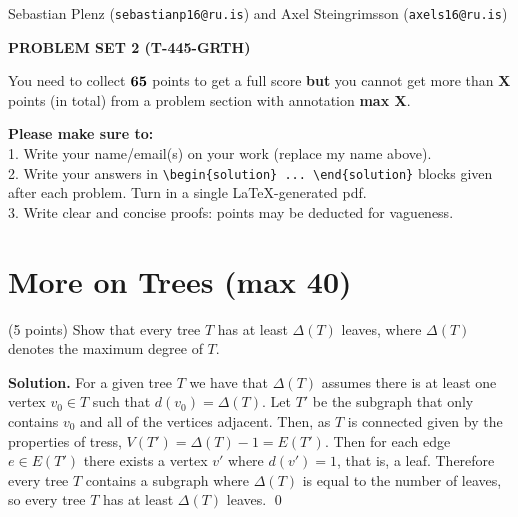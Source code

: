 \documentclass[a4paper,11pt]{amsart}
\newcounter{temp}
\newcounter{prob_counter}
\newenvironment{problem}
{\begin{list}{{\bf \arabic{prob_counter}}}{
      \usecounter{prob_counter}
      \addtolength{\labelsep}{.6ex}
      \addtolength{\itemsep}{4.3ex}
      \setlength{\leftmargin}{1.4em}}
      \setcounter{prob_counter}{\value{temp}}
}
{\setcounter{temp}{\value{prob_counter}}  
  \end{list}
}
\newenvironment{solution}{\textbf{Solution.}}{\qed}
\newcommand{\rubrik}[1]{\bigskip \begin{center}{\bf #1}\end{center} \medskip}
\begin{document}
\pagestyle{empty}
\thispagestyle{empty}

{\small{\sc\noindent
        Sebastian Plenz ({\tt sebastianp16@ru.is})  and Axel Steingrimsson ({\tt axels16@ru.is})
}}

\rubrik{PROBLEM SET 2 (T-445-GRTH)}

You need to collect $\bf 65$ points to get a full score {\bf but} you cannot get more than {\bf X} points (in total) from a problem section with annotation {\bf max X}.

{\bf Please make sure to:}\\
1. Write your name/email(s) on your work (replace my name above).\\
2. Write your answers in \texttt{{\textbackslash}begin\{solution\} ... {\textbackslash}end\{solution\}} blocks given after each problem. Turn in a single \LaTeX-generated pdf.\\
3. Write clear and concise proofs: points may be deducted for vagueness.




\section{More on Trees ({\bf max 40}) }

\begin{problem}
\item (5 points) Show that every tree $T$ has at least $\Delta(T)$ leaves, where $\Delta(T)$ denotes the maximum degree of $T$.
\end{problem}
\begin{solution}
	For a given tree $T$ we have that $\Delta(T)$ assumes there is at least one vertex $v_0 \in T$ such that $d(v_0) = \Delta(T)$. 
	Let $T'$ be the subgraph that only contains $v_0$ and all of the vertices adjacent.
	Then, as $T$ is connected given by the properties of tress, $V(T') = \Delta(T) - 1 = E(T')$. 
	Then for each edge $e \in E(T')$ there exists a vertex $v'$ where $d(v') = 1$, that is, a leaf. 
	Therefore every tree $T$ contains a subgraph where $\Delta(T)$ is equal to the number of leaves, so every tree $T$ has at least $\Delta(T)$ leaves. 
\end{solution}
\end{document}

